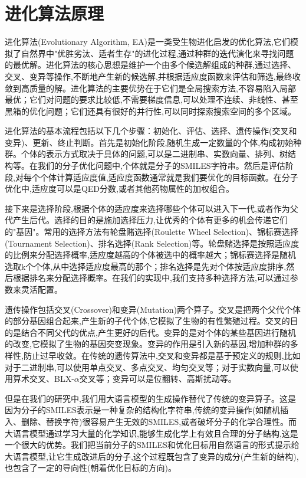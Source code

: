 \section{进化算法原理}

进化算法(Evolutionary Algorithm, EA)是一类受生物进化启发的优化算法,它们模拟了自然界中"优胜劣汰、适者生存"的进化过程,通过种群的迭代演化来寻找问题的最优解\cite{holland1992genetic}。进化算法的核心思想是维护一个由多个候选解组成的种群,通过选择、交叉、变异等操作,不断地产生新的候选解,并根据适应度函数来评估和筛选,最终收敛到高质量的解。进化算法的主要优势在于它们是全局搜索方法,不容易陷入局部最优；它们对问题的要求比较低,不需要梯度信息,可以处理不连续、非线性、甚至黑箱的优化问题；它们还具有很好的并行性,可以同时探索搜索空间的多个区域。

进化算法的基本流程包括以下几个步骤：初始化、评估、选择、遗传操作(交叉和变异)、更新、终止判断。首先是初始化阶段,随机生成一定数量的个体,构成初始种群。个体的表示方式取决于具体的问题,可以是二进制串、实数向量、排列、树结构等。在我们的分子优化问题中,个体就是分子的SMILES字符串。然后是评估阶段,对每个个体计算适应度值,适应度函数通常就是我们要优化的目标函数。在分子优化中,适应度可以是QED分数,或者其他药物属性的加权组合。

接下来是选择阶段,根据个体的适应度来选择哪些个体可以进入下一代,或者作为父代产生后代。选择的目的是施加选择压力,让优秀的个体有更多的机会传递它们的"基因"。常用的选择方法有轮盘赌选择(Roulette Wheel Selection)、锦标赛选择(Tournament Selection)、排名选择(Rank Selection)等。轮盘赌选择是按照适应度的比例来分配选择概率,适应度越高的个体被选中的概率越大；锦标赛选择是随机选取k个个体,从中选择适应度最高的那个；排名选择是先对个体按适应度排序,然后根据排名来分配选择概率。在我们的实现中,我们支持多种选择方法,可以通过参数来灵活配置。

遗传操作包括交叉(Crossover)和变异(Mutation)两个算子。交叉是把两个父代个体的部分基因组合起来,产生新的子代个体,它模拟了生物的有性繁殖过程。交叉的目的是结合不同父代的优点,产生更好的后代。变异的是对个体的某些基因进行随机的改变,它模拟了生物的基因突变现象。变异的作用是引入新的基因,增加种群的多样性,防止过早收敛。在传统的遗传算法中,交叉和变异都是基于预定义的规则,比如对于二进制串,可以使用单点交叉、多点交叉、均匀交叉等；对于实数向量,可以使用算术交叉、BLX-$\alpha$交叉等；变异可以是位翻转、高斯扰动等。

但是在我们的研究中,我们用大语言模型的生成操作替代了传统的变异算子。这是因为分子的SMILES表示是一种复杂的结构化字符串,传统的变异操作(如随机插入、删除、替换字符)很容易产生无效的SMILES,或者破坏分子的化学合理性。而大语言模型通过学习大量的化学知识,能够生成化学上有效且合理的分子结构,这是一个很大的优势。我们把当前分子的SMILES和优化目标用自然语言的形式提示给大语言模型,让它生成改进后的分子,这个过程既包含了变异的成分(产生新的结构),也包含了一定的导向性(朝着优化目标的方向)。

